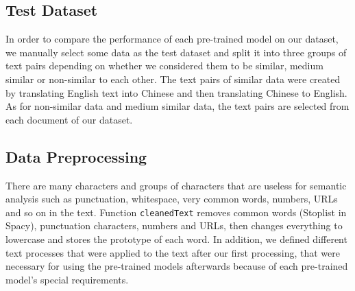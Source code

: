 \subsection{Test Dataset}
In order to compare the performance of each pre-trained model on our dataset, we manually select some data as the test dataset and split it into three groups of text pairs depending on whether we considered them to be similar, medium similar or non-similar to each other. The text pairs of similar data were created by translating English text into Chinese and then translating Chinese to English. As for non-similar data and medium similar data, the text pairs are selected from each document of our dataset.
\subsection{Data Preprocessing}
There are many characters and groups of characters that are useless for semantic analysis such as punctuation, whitespace, very common words, numbers, URLs and so on in the text. Function \texttt{cleanedText} removes common words (Stoplist in Spacy), punctuation characters, numbers and URLs, then changes everything to lowercase and stores the prototype of each word. In addition, we defined different text processes that were applied to the text after our first processing, that were necessary for using the pre-trained models afterwards because of each pre-trained model's special requirements.
